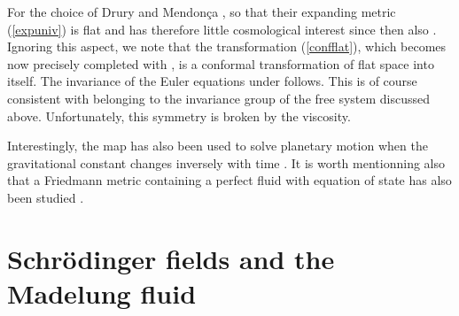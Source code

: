 \documentclass[11pt,a4paper]{article}
\let\ssection=\section
\renewcommand{\section}{\setcounter{equation}{0}\ssection}
\def\IR{{\bf R}}
\begin{document}
For the choice of Drury and Mendon\c ca   \coordHE{}, so that
their expanding metric (\ref{expuniv}) is flat
and has therefore little cosmological interest since then also \coordHE{}.
Ignoring this aspect, we note that the transformation (\ref{confflat}),
which becomes now precisely \myHighlight{$\Sigma$}\coordHE{} completed with
\coordHE{},  is a conformal transformation of flat space into
itself. The invariance of the Euler equations
under \myHighlight{$\Sigma$}\coordHE{} follows. This is of course consistent with \myHighlight{$\Sigma$}\coordHE{}
belonging to the \myHighlight{${\rm SL}(2,\IR)$}\coordHE{} invariance group of the free system
discussed above. Unfortunately, this symmetry is broken by the viscosity.

Interestingly, the  map \myHighlight{$\Sigma$}\coordHE{} has also been used
to solve planetary motion when the gravitational constant changes
inversely with time \cite{VIN, DGH}.
It is worth mentionning also that a Friedmann metric
containing a perfect fluid with equation of state
\coordHE{} has also been studied \cite{BARROW}.


\section{Schr\"odinger fields and the Madelung fluid}
\end{document}
